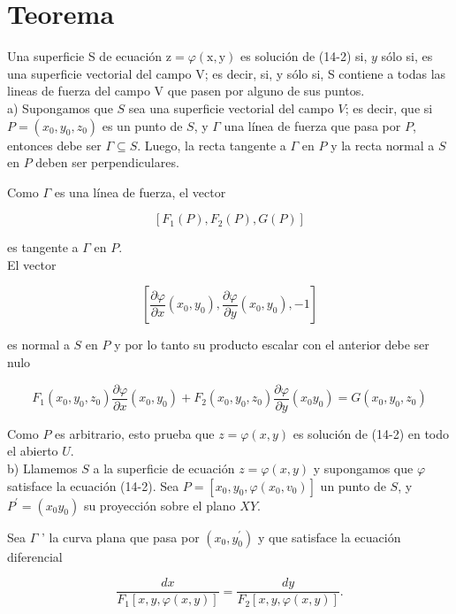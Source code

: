 \documentclass[10pt]{article}
\theoremstyle{plain}
\theoremstyle{definition}
\theoremstyle{remark}
\begin{document}
\section*{Teorema}
Una superficie S de ecuación $\mathrm{z}=\varphi(\mathrm{x}, \mathrm{y})$ es solución de (14-2) si, $y$ sólo si, es una superficie vectorial del campo V; es decir, si, y sólo si, S contiene a todas las lineas de fuerza del campo V que pasen por alguno de sus puntos.\\
a) Supongamos que $S$ sea una superficie vectorial del campo $V$; es decir, que si $P=\left(x_{0}, y_{0}, z_{0}\right)$ es un punto de $S$, y $\Gamma$ una línea de fuerza que pasa por $P$, entonces debe ser $\Gamma \subseteq S$. Luego, la recta tangente a $\Gamma$ en $P$ y la recta normal a $S$ en $P$ deben ser perpendiculares.

Como $\Gamma$ es una línea de fuerza, el vector

$$
\left[F_{1}(P), F_{2}(P), G(P)\right]
$$

es tangente a $\Gamma$ en $P$.\\
El vector

$$
\left[\frac{\partial \varphi}{\partial x}\left(x_{0}, y_{0}\right), \frac{\partial \varphi}{\partial y}\left(x_{0}, y_{0}\right),-1\right]
$$

es normal a $S$ en $P$ y por lo tanto su producto escalar con el anterior debe ser nulo

$$
F_{1}\left(x_{0}, y_{0}, z_{0}\right) \frac{\partial \varphi}{\partial x}\left(x_{0}, y_{0}\right)+F_{2}\left(x_{0}, y_{0}, z_{0}\right) \frac{\partial \varphi}{\partial y}\left(x_{0} y_{0}\right)=G\left(x_{0}, y_{0}, z_{0}\right)
$$

Como $P$ es arbitrario, esto prueba que $z=\varphi(x, y)$ es solución de (14-2) en todo el abierto $U$.\\
b) Llamemos $S$ a la superficie de ecuación $z=\varphi(x, y)$ y supongamos que $\varphi$ satisface la ecuación (14-2). Sea $P=\left[x_{0}, y_{0}, \varphi\left(x_{0}, v_{0}\right)\right]$ un punto de $S$, y $P^{\prime}=\left(x_{0} y_{0}\right)$ su proyección sobre el plano $X Y$.

Sea $\Gamma$ ' la curva plana que pasa por $\left(x_{0}, y_{0}^{\prime}\right)$ y que satisface la ecuación diferencial


\begin{equation*}
\frac{d x}{F_{1}[x, y, \varphi(x, y)]}=\frac{d y}{F_{2}[x, y, \varphi(x, y)]} . \tag{14-3}
\end{equation*}
\end{document}
